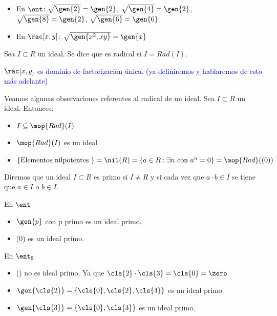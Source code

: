 \begin{example}
\begin{itemize}
	\item En $\ent$: $\sqrt{\gen{2}}=\gen{2}$, $\sqrt{\gen{4}}=\gen{2}$, $\sqrt{\gen{8}}=\gen{2}$, $\sqrt{\gen{6}}=\gen{6}$
	\item En $\rac[x,y]$: $\sqrt{\gen{x^2,xy}}=\gen{x}$
\end{itemize}
\end{example}

\begin{defn}
	Sea $I\subset R$ un ideal. Se dice que es radical si $I=Rad(I)$.
\end{defn}

\textcolor{blue}{\obs $\rac[x,y]$ es dominio de factorización única. (ya definiremos y hablaremos de esto más adelante)}

Veamos algunas observaciones referentes al radical de un ideal. Sea $I \subset R$ un ideal. Entonces:
\begin{itemize}
	\item $I \subseteq \mop{Rad}(I)$
	\item $\mop{Rad}(I)$ es un ideal
	\item $\{\text{Elementos nilpotentes }\}=\nil(R)=\{a\in R: \exists n \text{ con }a^n=0 \}=\mop{Rad}((0))$
\end{itemize}

\begin{defn} \label{def:IdealPrimo}
	Diremos que un ideal $I\subset R$ es primo si $I\neq R$ y si cada vez que $a\cdot b \in I$ se tiene que $a\in I$ o $b\in I$.
\end{defn}

\begin{example} En $\ent$
	\begin{itemize}
		\item $\gen{p}$ con p primo es un ideal primo.
		\item (0) es un ideal primo.
	\end{itemize}
\end{example}

\begin{example} En $\ent_6$
	\begin{itemize}
		\item (\zero) no es ideal primo. Ya que $\cls{2} \cdot \cls{3}=\cls{0}=\zero$
		\item $\gen{\cls{2}}=\{\cls{0},\cls{2},\cls{4} \}$ es un ideal primo.
		\item $\gen{\cls{3}}=\{\cls{0},\cls{3} \}$ es un ideal primo.
	\end{itemize}
\end{example}


